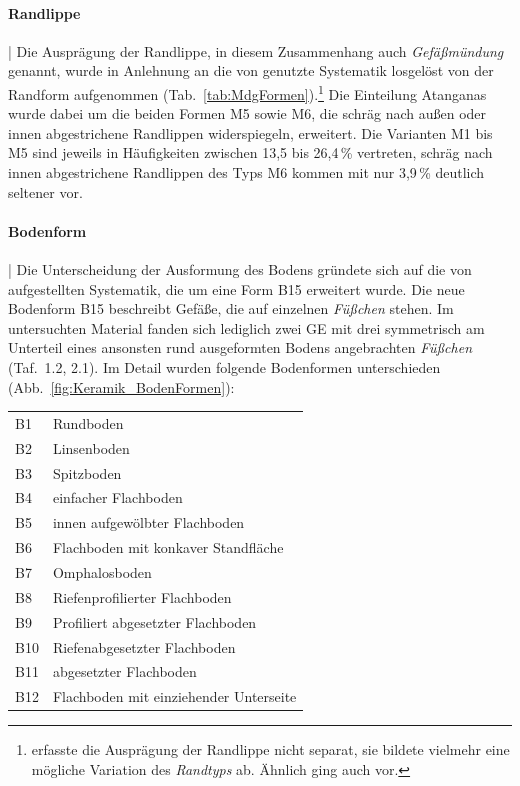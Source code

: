 \begin{multicols}{2}
\paragraph{Randlippe}\hspace{-.5em}|\hspace{.5em}%
Die Ausprägung der Randlippe, in diesem Zusammenhang auch \textit{Gefäßmündung} genannt, wurde in Anlehnung an die von \textcite[162f Tab.~24]{Atangana.1988} genutzte Systematik losgelöst von der Randform aufgenommen (Tab.~\ref{tab:MdgFormen}).\footnote{\textcite[48]{Wotzka.1995} erfasste die Ausprägung der Randlippe nicht separat, sie bildete vielmehr eine mögliche Variation des \textit{Randtyps} ab. Ähnlich ging auch \textcite[110]{Jesse.2003} vor.} Die Einteilung Atanganas wurde dabei um die beiden Formen M5 sowie M6, die schräg nach außen oder innen abgestrichene Randlippen widerspiegeln, erweitert. Die Varianten M1 bis M5 sind jeweils in Häufigkeiten zwischen 13,5 bis 26,4\,\% vertreten, schräg nach innen abgestrichene Randlippen des Typs M6 kommen mit nur 3,9\,\% deutlich seltener vor.

\paragraph{Bodenform}\hspace{-.5em}|\hspace{.5em}\label{sec:Bodenform}
Die Unterscheidung der Ausformung des Bodens gründete sich auf die von \textcite[440 Taf.~6]{Wotzka.1995} aufgestellten Systematik, die um eine Form B15 erweitert wurde. Die neue Bodenform B15 beschreibt Gefäße, die auf einzelnen \textit{Füßchen} stehen. Im untersuchten Material fanden sich lediglich zwei GE mit drei symmetrisch am Unterteil eines ansonsten rund ausgeformten Bodens angebrachten \textit{Füßchen} (Taf.~1.2, 2.1). Im Detail wurden folgende Bodenformen unterschieden (Abb.~\ref{fig:Keramik_BodenFormen}):
\setlength\LTleft{0pt}
\vspace{.25em}
\noindent\begin{tabular}{@{}ll@{}}
	B1 & Rundboden \\
	B2 & Linsenboden \\
	B3 & Spitzboden \\
	B4 & einfacher Flachboden \\
	B5 & innen aufgewölbter Flachboden  \\
	B6 & Flachboden mit konkaver Standfläche \\
	B7 & Omphalosboden \\
	B8 & Riefenprofilierter Flachboden \\
	B9 & Profiliert abgesetzter Flachboden \\
	B10 & Riefenabgesetzter Flachboden \\
	B11 & abgesetzter Flachboden \\
	B12 & Flachboden mit einziehender Unterseite\\
\end{tabular}


\end{multicols}

